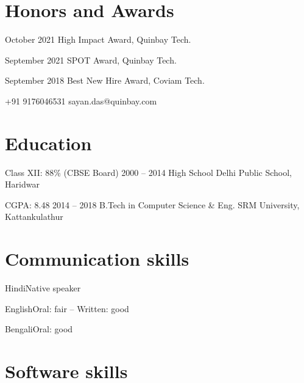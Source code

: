 \documentclass{tccv}
\makeatletter
\newcommand{\at}{\makeatletter @\makeatother}
\makeatother
\begin{document}
\section{Honors and Awards}

\begin{eventlist}

\item{October 2021}
     {High Impact Award, Quinbay Tech.}
     {}



 \item{September 2021}
     {SPOT Award, Quinbay Tech.}
     {}

\item{September 2018}
     {Best New Hire Award, Coviam Tech.}
     {}


\end{eventlist}

    {+91 9176046531}
    {sayan.das\at quinbay.com}

\section{Education}

\begin{yearlist}

\item[Class XII: 88\% (CBSE Board)]{2000 -- 2014}
     {High School}
     {Delhi Public School, Haridwar}

\item[CGPA: 8.48]{2014 -- 2018}
     {B.Tech in Computer Science \& Eng.}
     {SRM University, Kattankulathur}

\end{yearlist}


\section{Communication skills}

\begin{factlist}
\item{Hindi}{Native speaker}
\item{English}{Oral: fair -- Written: good}
\item{Bengali}{Oral: good}
\end{factlist}

\section{Software skills}
\end{document}
